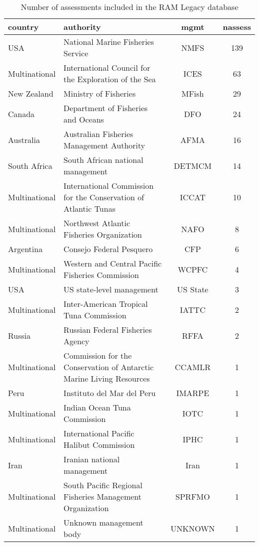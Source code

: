 \begin{table}[ht]
\begin{center}
\caption{Number of assessments included in the RAM Legacy database}
\label{tab:mgmt}
\begin{tabular}{p{3cm}p{5cm}cc}
  \hline
country & authority & mgmt & nassess \\ 
  \hline
USA & National Marine Fisheries Service & NMFS & 139 \\ 
  Multinational & International Council for the Exploration of the Sea & ICES &  63 \\ 
  New Zealand & Ministry of Fisheries & MFish &  29 \\ 
  Canada & Department of Fisheries and Oceans & DFO &  24 \\ 
  Australia & Australian Fisheries Management Authority & AFMA &  16 \\ 
  South Africa & South African national management & DETMCM &  14 \\ 
  Multinational & International Commission for the Conservation of Atlantic Tunas & ICCAT &  10 \\ 
  Multinational & Northwest Atlantic Fisheries Organization & NAFO &   8 \\ 
  Argentina & Consejo Federal Pesquero & CFP &   6 \\ 
  Multinational & Western and Central Pacific Fisheries Commission & WCPFC &   4 \\ 
  USA & US state-level management & US State &   3 \\ 
  Multinational & Inter-American Tropical Tuna Commission & IATTC &   2 \\ 
  Russia & Russian Federal Fisheries Agency & RFFA &   2 \\ 
  Multinational & Commission for the Conservation of Antarctic Marine Living Resources & CCAMLR &   1 \\ 
  Peru & Instituto del Mar del Peru & IMARPE &   1 \\ 
  Multinational & Indian Ocean Tuna Commission & IOTC &   1 \\ 
  Multinational & International Pacific Halibut Commission & IPHC &   1 \\ 
  Iran & Iranian national management & Iran &   1 \\ 
  Multinational & South Pacific Regional Fisheries Management Organization & SPRFMO &   1 \\ 
  Multinational & Unknown management body & UNKNOWN &   1 \\ 
   \hline
\end{tabular}
\end{center}
\end{table}
